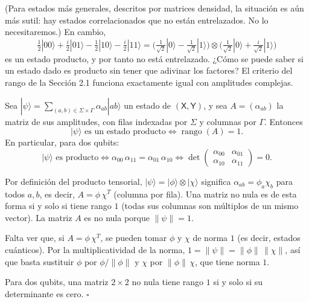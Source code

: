 \documentclass[11pt, a4paper, twoside, openright]{report}
\begin{document}
\noindent (Para estados más generales, descritos por matrices densidad, la situación es aún más sutil: hay estados correlacionados que no están entrelazados. No lo necesitaremos.) En cambio,
\[ \tfrac12|00\rangle + \tfrac{i}{2}|01\rangle - \tfrac12|10\rangle - \tfrac{i}{2}|11\rangle = \Big(\tfrac{1}{\sqrt2}|0\rangle - \tfrac{1}{\sqrt2}|1\rangle\Big)\otimes\Big(\tfrac{1}{\sqrt2}|0\rangle + \tfrac{i}{\sqrt2}|1\rangle\Big) \]
es un estado producto, y por tanto no está entrelazado. ¿Cómo se puede saber si un estado dado es producto sin tener que adivinar los factores? El criterio del rango de la Sección 2.1 funciona exactamente igual con amplitudes complejas.

\begin{tcolorbox}[colback=teal!5!white,colframe=teal!75!black,title=\textbf{Proposición: Criterio del rango para el entrelazamiento}]
Sea $|\psi\rangle = \sum_{(a,b)\in\Sigma\times\Gamma}\alpha_{ab}|ab\rangle$ un estado de $(\mathsf{X},\mathsf{Y})$, y sea $A = (\alpha_{ab})$ la matriz de sus amplitudes, con filas indexadas por $\Sigma$ y columnas por $\Gamma$. Entonces
\[ |\psi\rangle \text{ es un estado producto} \iff \operatorname{rango}(A) = 1. \]
En particular, para dos qubits:
\[ |\psi\rangle \text{ es producto} \iff \alpha_{00}\,\alpha_{11} = \alpha_{01}\,\alpha_{10} \iff \det\begin{pmatrix}\alpha_{00} & \alpha_{01}\\ \alpha_{10} & \alpha_{11}\end{pmatrix} = 0. \]
\end{tcolorbox}

\begin{tcolorbox}[colback=gray!5!white,colframe=gray!75!black,title=\textbf{Demostración}]
Por definición del producto tensorial, $|\psi\rangle = |\phi\rangle\otimes|\chi\rangle$ significa $\alpha_{ab} = \phi_a\chi_b$ para todos $a, b$, es decir, $A = \phi\,\chi^T$ (columna por fila). Una matriz no nula es de esta forma si y solo si tiene rango $1$ (todas sus columnas son múltiplos de un mismo vector). La matriz $A$ es no nula porque $\|\psi\| = 1$.

Falta ver que, si $A = \phi\,\chi^T$, se pueden tomar $\phi$ y $\chi$ de norma $1$ (es decir, estados cuánticos). Por la multiplicatividad de la norma, $1 = \|\psi\| = \|\phi\|\,\|\chi\|$, así que basta sustituir $\phi$ por $\phi/\|\phi\|$ y $\chi$ por $\|\phi\|\,\chi$, que tiene norma $1$.

Para dos qubits, una matriz $2\times2$ no nula tiene rango $1$ si y solo si su determinante es cero. \hfill $\square$
\end{tcolorbox}
\end{document}
